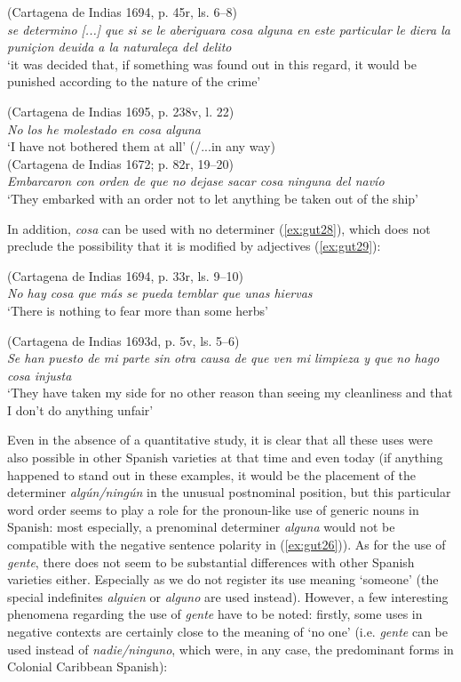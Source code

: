 \documentclass[output=paper,colorlinks,citecolor=brown]{langscibook}
\begin{document}
\ea \label{ex:gut25}
    (Cartagena de Indias 1694, p. 45r, ls. 6--8)\\
    \textit{se determino [...] que si se le aberiguara cosa alguna en este particular le diera la puniçion deuida a la naturaleça del delito}\\
    ‘it was decided that, if something was found out in this regard, it would be punished according to the nature of the crime’
    
     \ex \label{ex:gut26}     
     (Cartagena de Indias 1695, p. 238v, l. 22)\\
     \textit{No los he molestado en cosa alguna}\\
    ‘I have not bothered them at all’ (/...in any way)\\
    
     \ex \label{ex:gut27}(Cartagena de Indias 1672; p. 82r, 19--20)\\
     \textit{Embarcaron con orden de que no dejase sacar cosa ninguna del navío}\\
    ‘They embarked with an order not to let anything be taken out of the ship’
\z

In addition, \textit{cosa} can be used with no determiner (\ref{ex:gut28}), which does not preclude the possibility that it is modified by adjectives (\ref{ex:gut29}):

\ea \label{ex:gut28}
    (Cartagena de Indias 1694, p. 33r, ls. 9--10)\\
     \textit{No hay cosa que más se pueda temblar que unas hiervas}\\
     ‘There is nothing to fear more than some herbs’
    
     \ex \label{ex:gut29}
     (Cartagena de Indias 1693d, p. 5v, ls. 5--6)\\
     \textit{Se han puesto de mi parte sin otra causa de que ven mi limpieza y que no hago cosa injusta}\\
    ‘They have taken my side for no other reason than seeing my cleanliness and that I don't do anything unfair’
\z

Even in the absence of a quantitative study, it is clear that all these uses were also possible in other Spanish varieties at that time and even today (if anything happened to stand out in these examples, it would be the placement of the determiner \textit{algún/ningún} in the unusual postnominal position, but this particular word order seems to play a role for the pronoun-like use of generic nouns in Spanish: most especially, a prenominal determiner \textit{alguna} would not be compatible with the negative sentence polarity in (\ref{ex:gut26})). As for the use of \textit{gente}, there does not seem to be substantial differences with other Spanish varieties either. Especially as we do not register its use meaning ‘someone’ (the special indefinites \textit{alguien} or \textit{alguno} are used instead). However, a few interesting phenomena regarding the use of \textit{gente} have to be noted: firstly, some uses in negative contexts are certainly close to the meaning of ‘no one’ (i.e. \textit{gente} can be used instead of \textit{nadie/ninguno}, which were, in any case, the predominant forms in Colonial Caribbean Spanish):
\end{document}
